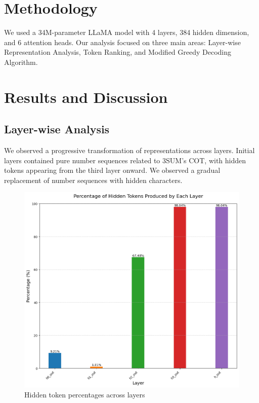 \documentclass[10pt,a4paper]{article}
\begin{document}
\section{Methodology}
We used a 34M-parameter LLaMA model with 4 layers, 384 hidden dimension, and 6 attention heads\cite{4}. Our analysis focused on three main areas: Layer-wise Representation Analysis, Token Ranking, and Modified Greedy Decoding Algorithm.

\section{Results and Discussion}

\subsection{Layer-wise Analysis}
We observed a progressive transformation of representations across layers. Initial layers contained pure number sequences related to 3SUM's COT, with hidden tokens appearing from the third layer onward. We observed a gradual replacement of number sequences with hidden characters.

\begin{figure}[h]
\centering
\includegraphics[width=\textwidth]{hidden_tokens_percentage_by_layer.png}
\caption{Hidden token percentages across layers}
\label{fig:hidden_token_percentages}
\end{figure}
\end{document}
